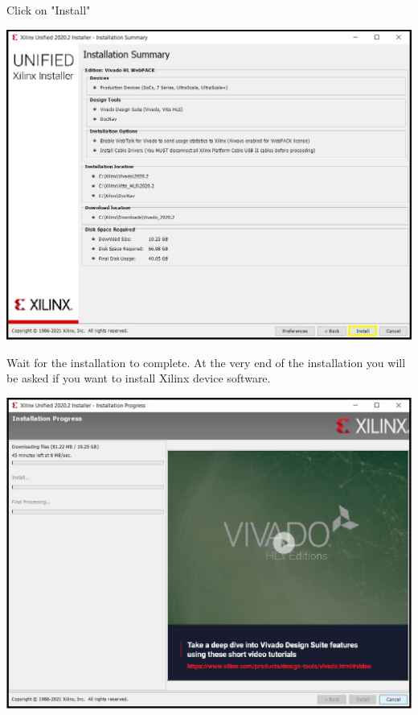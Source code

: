 \begin{minipage}{\linewidth}
  Click on "Install"
  \\
  \begin{center}
    \includegraphics[width=0.7\linewidth]{images/VivadoInstimg016.jpg}
  \end{center}
\end{minipage}

\begin{minipage}{\linewidth}
  Wait for the installation to complete. At the very end of the installation you will be asked if you want
  to install Xilinx device software.
  \\
  \begin{center}
    \includegraphics[width=0.7\linewidth]{images/VivadoInstimg017.jpg}
  \end{center}  
\end{minipage}

